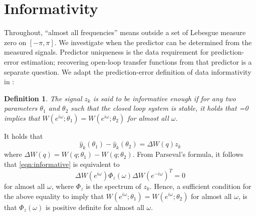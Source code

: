 \documentclass[journal,twoside,web]{ieeecolor}
\newtheorem{definition}{Definition}
\begin{document}
\section{Informativity}
%
Throughout, ``almost all frequencies'' means outside a set of Lebesgue
measure zero on $[-\pi,\pi]$.
We investigate when the predictor can be determined from the measured signals.
Predictor uniqueness is the data requirement for prediction-error estimation;
recovering open-loop transfer functions from that predictor is a separate question.
We adapt the prediction-error definition of data informativity
in \cite{BOMBOIS2023110742}:
%
\begin{definition}
The signal $z_k$ is said to be {\it informative enough} if for any two parameters 
$\theta_1$ and $\theta_2$ such that the closed loop system is stable, it holds that 
%
\BEQ\label{eqn:informative}
=0
\EEQ
%
implies that $ W\left(e^{i\omega};\theta_1\right)= W\left(e^{i\omega};\theta_2\right)$ for almost  
all $\omega$. 
\end{definition}
%
It holds that 
%
$$\hat y_k(\theta_1)
-\hat y_k(\theta_2)=\Delta W(q)z_k$$
%
where $\Delta W(q)= W(q;\theta_1)- W(q;\theta_2)$. 
From Parseval's formula, it follows that 
\eqref{eqn:informative} is equivalent to 
%
$$\Delta  W\left(e^{i\omega}\right)\Phi_z(\omega)
\Delta  W\left(e^{-i\omega}\right)^T=0$$
%
for almost all $\omega$, where $\Phi_z$ is the spectrum of $z_k$. Hence, a sufficient condition for the 
above equality to imply that $ W\left(e^{i\omega};\theta_1\right)= W\left(e^{i\omega};\theta_2\right)$ for almost  
all $\omega$, is that $\Phi_z(\omega)$ is positive definite for almost all 
$\omega$.
\end{document}
